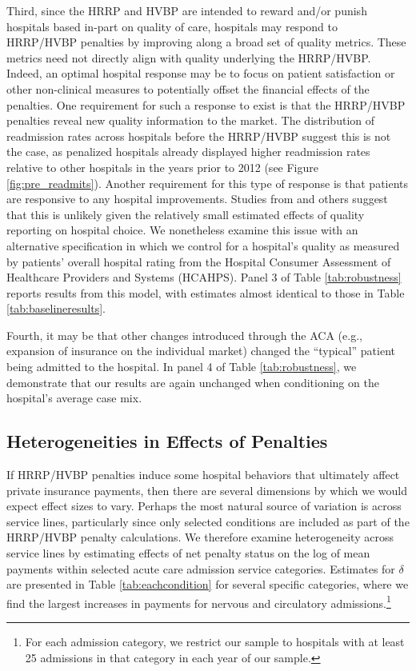 \documentclass[12pt]{article}
\begin{document}
Third, since the HRRP and HVBP are intended to reward and/or punish hospitals based in-part on quality of care, hospitals may respond to HRRP/HVBP penalties by improving along a broad set of quality metrics. These metrics need not directly align with quality underlying the HRRP/HVBP. Indeed, an optimal hospital response may be to focus on patient satisfaction or other non-clinical measures to potentially offset the financial effects of the penalties. One requirement for such a response to exist is that the HRRP/HVBP penalties reveal new quality information to the market. The distribution of readmission rates across hospitals before the HRRP/HVBP suggest this is not the case, as penalized hospitals already displayed higher readmission rates relative to other hospitals in the years prior to 2012 (see Figure \ref{fig:pre_readmits}). Another requirement for this type of response is that patients are responsive to any hospital improvements. Studies from \cite{dranove2008} and others suggest that this is unlikely given the relatively small estimated effects of quality reporting on hospital choice. We nonetheless examine this issue with an alternative specification in which we control for a hospital's quality as measured by patients' overall hospital rating from the Hospital Consumer Assessment of Healthcare Providers and Systems (HCAHPS). Panel 3 of Table \ref{tab:robustness} reports results from this model, with estimates almost identical to those in Table \ref{tab:baselineresults}.

Fourth, it may be that other changes introduced through the ACA (e.g., expansion of insurance on the individual market) changed the ``typical'' patient being admitted to the hospital. In panel 4 of Table \ref{tab:robustness}, we demonstrate that our results are again unchanged when conditioning on the hospital's average case mix.

\subsection{Heterogeneities in Effects of Penalties}
If HRRP/HVBP penalties induce some hospital behaviors that ultimately affect private insurance payments, then there are several dimensions by which we would expect effect sizes to vary. Perhaps the most natural source of variation is across service lines, particularly since only selected conditions are included as part of the HRRP/HVBP penalty calculations. We therefore examine heterogeneity across service lines by estimating effects of net penalty status on the log of mean payments within selected acute care admission service categories. Estimates for $\delta$ are presented in Table \ref{tab:eachcondition} for several specific categories, where we find the largest increases in payments for nervous and circulatory admissions.\footnote{For each admission category, we restrict our sample to hospitals with at least 25 admissions in that category in each year of our sample.}
\end{document}
